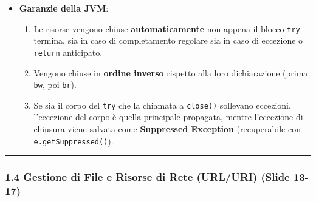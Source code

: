 \documentclass[11pt,a4paper]{article}
\newcommand{\passthrough}[1]{#1}
\providecommand{\tightlist}{\setlength{\itemsep}{0pt}\setlength{\parskip}{0pt}}
\begin{document}
\begin{itemize}
\tightlist
\item
  \textbf{Garanzie della JVM}:

  \begin{enumerate}
  \def\labelenumi{\arabic{enumi}.}
  \tightlist
  \item
    Le risorse vengono chiuse \textbf{automaticamente} non appena il
    blocco \passthrough{\lstinline!try!} termina, sia in caso di
    completamento regolare sia in caso di eccezione o
    \passthrough{\lstinline!return!} anticipato.
  \item
    Vengono chiuse in \textbf{ordine inverso} rispetto alla loro
    dichiarazione (prima \passthrough{\lstinline!bw!}, poi
    \passthrough{\lstinline!br!}).
  \item
    Se sia il corpo del \passthrough{\lstinline!try!} che la chiamata a
    \passthrough{\lstinline!close()!} sollevano eccezioni, l'eccezione
    del corpo è quella principale propagata, mentre l'eccezione di
    chiusura viene salvata come \textbf{Suppressed Exception}
    (recuperabile con \passthrough{\lstinline!e.getSuppressed()!}).
  \end{enumerate}
\end{itemize}

\begin{center}\rule{0.5\linewidth}{0.5pt}\end{center}

\subsubsection{1.4 Gestione di File e Risorse di Rete (URL/URI) (Slide
13-17)}\label{gestione-di-file-e-risorse-di-rete-urluri-slide-13-17}
\end{document}
